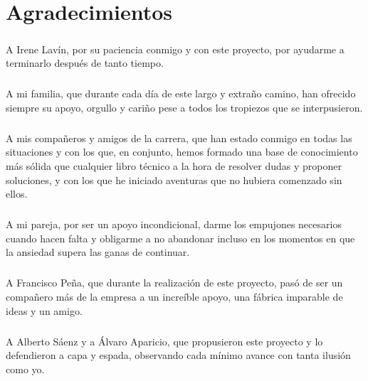 \documentclass{subfiles}
\begin{document}
  \chapter*{Agradecimientos}
  \label{sec:acknowledgements}

    \paragraph{}
    A Irene Lavín, por su paciencia conmigo y con este proyecto, por ayudarme a terminarlo después de tanto tiempo.

    \paragraph{}
    A mi familia, que durante cada día de este largo y extraño camino, han ofrecido siempre su apoyo, orgullo y cariño pese a todos los tropiezos que se interpusieron.

    \paragraph{}
    A mis compañeros y amigos de la carrera, que han estado conmigo en todas las situaciones y con los que, en conjunto, hemos formado una base de conocimiento más sólida que cualquier libro técnico a la hora de resolver dudas y proponer soluciones, y con los que he iniciado aventuras que no hubiera comenzado sin ellos.

    \paragraph{}
    A mi pareja, por ser un apoyo incondicional, darme los empujones necesarios cuando hacen falta y obligarme a no abandonar incluso en los momentos en que la ansiedad supera las ganas de continuar.

    \paragraph{}
    A Francisco Peña, que durante la realización de este proyecto, pasó de ser un compañero más de la empresa a un increíble apoyo, una fábrica imparable de ideas y un amigo.

    \paragraph{}
    A Alberto Sáenz y a Álvaro Aparicio, que propusieron este proyecto y lo defendieron a capa y espada, observando cada mínimo avance con tanta ilusión como yo.
\end{document}
